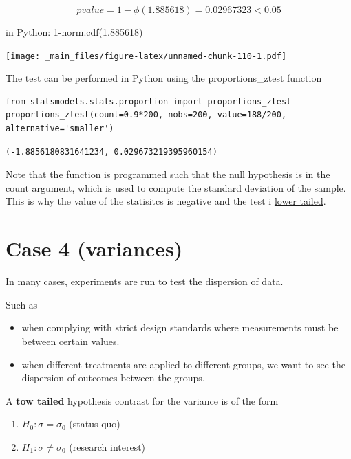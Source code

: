 \documentclass[
]{book}
\providecommand{\tightlist}{%
  \setlength{\itemsep}{0pt}\setlength{\parskip}{0pt}}
\begin{document}
\[pvalue=1-\phi(1.885618)=0.02967323<0.05\]

in Python: 1-norm.cdf(1.885618)

\texttt{[image: \_main\_files/figure-latex/unnamed-chunk-110-1.pdf]}

The test can be performed in Python using the proportions\_ztest function

\begin{verbatim}
from statsmodels.stats.proportion import proportions_ztest
proportions_ztest(count=0.9*200, nobs=200, value=188/200, alternative='smaller')
\end{verbatim}

\begin{verbatim}
(-1.8856180831641234, 0.029673219395960154)
\end{verbatim}

Note that the function is programmed such that the null hypothesis is in the count argument, which is used to compute the standard deviation of the sample. This is why the value of the statisitcs is negative and the test i \href{https://www.geeksforgeeks.org/how-to-perform-a-one-proportion-z-test-in-python/}{lower tailed}.

\hypertarget{case-4-variances}{%
\section{Case 4 (variances)}\label{case-4-variances}}

In many cases, experiments are run to test the dispersion of data.

Such as

\begin{itemize}
\item
  when complying with strict design standards where measurements must be between certain values.
\item
  when different treatments are applied to different groups, we want to see the dispersion of outcomes between the groups.
\end{itemize}

A \textbf{tow tailed} hypothesis contrast for the variance is of the form

\begin{enumerate}
\def\labelenumi{\alph{enumi}.}
\tightlist
\item
  \(H_0:\sigma = \sigma_0\) (status quo)
\item
  \(H_1:\sigma \neq \sigma_0\) (research interest)
\end{enumerate}
\end{document}
